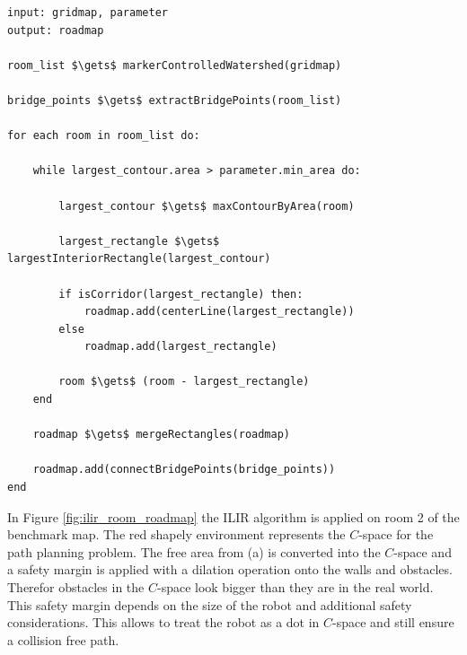 \begin{lstlisting}[float=h]
input: gridmap, parameter
output: roadmap

room_list $\gets$ markerControlledWatershed(gridmap)

bridge_points $\gets$ extractBridgePoints(room_list)

for each room in room_list do:

    while largest_contour.area > parameter.min_area do:
    
        largest_contour $\gets$ maxContourByArea(room)
            
        largest_rectangle $\gets$ largestInteriorRectangle(largest_contour)

        if isCorridor(largest_rectangle) then:
            roadmap.add(centerLine(largest_rectangle))
        else
            roadmap.add(largest_rectangle)

        room $\gets$ (room - largest_rectangle)
    end

    roadmap $\gets$ mergeRectangles(roadmap)
    
    roadmap.add(connectBridgePoints(bridge_points))
end
\end{lstlisting}

In Figure \ref{fig:ilir_room_roadmap} the ILIR algorithm is applied on room 2 of the benchmark map. The red shapely environment represents the \(C\)-space for the path planning problem. The free area from (a) is converted into the \(C\)-space and a safety margin is applied with a dilation operation onto the walls and obstacles.  Therefor obstacles in the \(C\)-space look bigger than they are in the real world. This safety margin depends on the size of the robot and additional safety considerations. This allows to treat the robot as a dot in \(C\)-space and still ensure a collision free path. 

